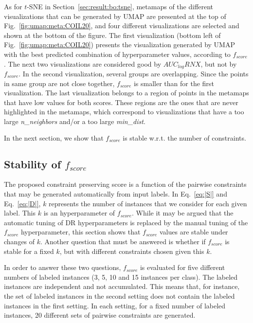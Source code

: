 As for $t$-SNE in Section~\ref{sec:result:bo:tsne}, metamaps of the different visualizations that can be generated by UMAP are presented at the top of Fig.~\ref{fig:umap:meta:COIL20}, and four different visualizations are selected and shown at the bottom of the figure.
The first visualization (bottom left of Fig.~\ref{fig:umap:meta:COIL20}) presents the visualization generated by UMAP with the best predicted combination of hyperparameter values, according to $f_{score}$.
The next two visualizations are considered good by $AUC_{log}RNX$, but not by $f_{score}$.
In the second visualization, several groups are overlapping. Since the points in same group are not close together, $f_{score}$ is smaller than for the first visualization.
The last visualization belongs to a region of points in the metamaps that have low values for both scores.
These regions are the ones that are never highlighted in the metamaps, which correspond to visualizations that have a too large \emph{n\_neighbors} and/or a too large \emph{min\_dist}. 

In the next section, we show that $f_{score}$ is stable w.r.t. the number of constraints.

\subsection{Stability of $f_{score}$}\label{sec:result:stability}

The proposed constraint preserving score is a function of the pairwise constraints that may be generated automatically from input labels. In Eq.~\ref{eq:|S|} and Eq.~\ref{eq:|D|}, $k$ represents the number of instances that we consider for each given label. This $k$ is an hyperparameter of $f_{score}$. While it may be argued that the automatic tuning of DR hyperparameters is replaced by the manual tuning of the $f_{score}$ hyperparameter, this section shows that $f_{score}$ values are stable under changes of $k$. Another question that must be answered is whether if $f_{score}$ is stable for a fixed $k$, but with different constraints chosen given this $k$.

In order to answer these two questions, $f_{score}$ is evaluated for five different numbers of labeled instances (3, 5, 10 and 15 instances per class).
The labeled instances are independent and not accumulated. This means that, for instance, the set of labeled instances in the second setting does not contain the labeled instances in the first setting.
In each setting, for a fixed number of labeled instances, 20 different sets of pairwise constraints are generated.

